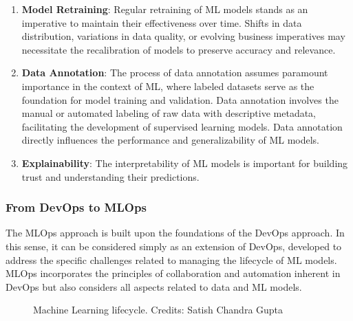 \begin{enumerate}
    \item \textbf{Model Retraining}: Regular retraining of ML models stands as an imperative to maintain their effectiveness over time. Shifts in data distribution, variations in data quality, or evolving business imperatives may necessitate the recalibration of models to preserve accuracy and relevance. 

    \item \textbf{Data Annotation}: The process of data annotation assumes paramount importance in the context of ML, where labeled datasets serve as the foundation for model training and validation. Data annotation involves the manual or automated labeling of raw data with descriptive metadata, facilitating the development of supervised learning models. Data annotation directly influences the performance and generalizability of ML models.

    \item \textbf{Explainability}: The interpretability of ML models is important for building trust and understanding their predictions.
\end{enumerate}


\subsubsection{From DevOps to MLOps}

The MLOps approach is built upon the foundations of the DevOps approach. In this sense, it can be considered simply as an extension of DevOps, developed to address the specific challenges related to managing the lifecycle of ML models. MLOps incorporates the principles of collaboration and automation inherent in DevOps but also considers all aspects related to data and ML models.

\begin{figure}[htbp]
    \centering
    \caption{Machine Learning lifecycle. Credits: Satish Chandra Gupta}
    \label{fig:mlops-cycle}
\end{figure}


